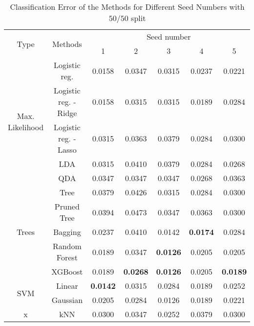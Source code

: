 \begin{table}[htb]
	\caption{Classification Error of the Methods for Different Seed Numbers with $50/50$ split}
	\begin{center}
		\begin{tabular}{@{} c c c  c c c c @{}}\toprule
			\multirow{2}{*}{Type} & \multirow{2}{*}{Methods} &  \multicolumn{5}{c}{Seed number}\\
			& & 1 & 2 & 3 & 4 & 5 \\
			\midrule
			\multirow{5}{*}{Max. Likelihood} & Logistic reg. & \num{0.0158} & \num{0.0347} & \num{0.0315} & \num{0.0237} & \num{0.0221} \\
			& Logistic reg. - Ridge & \num{0.0158} & \num{0.0315} & \num{0.0315} & \num{0.0189} & \num{0.0284} \\
			& Logistic reg. - Lasso & \num{0.0315} & \num{0.0363} & \num{0.0379} & \num{0.0284} & \num{0.0300} \\
			& LDA & \num{0.0315} & \num{0.0410} & \num{0.0379} & \num{0.0284} & \num{0.0268} \\
			& QDA & \num{0.0347} & \num{0.0347} & \num{0.0347} & \num{0.0268} & \num{0.0363} \\
			\cmidrule{1-7}
			\multirow{5}{*}{Trees} & Tree & \num{0.0379} & \num{0.0426} & \num{0.0315} & \num{0.0284} & \num{0.0300}\\
			& Pruned Tree & \num{0.0394} & \num{0.0473} & \num{0.0347} & \num{0.0363} & \num{0.0300}\\  
			& Bagging & \num{0.0237} & \num{0.0410} & \num{0.0142} & \textbf{\num{0.0174}} & \num{0.0284}\\
			& Random Forest & \num{0.0189} & \num{0.0347} & \textbf{\num{0.0126}} & \num{0.0205} & \num{0.0205}\\
			& XGBoost & \num{0.0189} & \textbf{\num{0.0268}} & \textbf{\num{0.0126}} & \num{0.0205} & \textbf{\num{0.0189}}\\
			\cmidrule{1-7}
			\multirow{2}{*}{SVM} & Linear & \textbf{\num{0.0142}} & \num{0.0315} & \num{0.0284} & \num{0.0189} & \num{0.0252}\\
			& Gaussian & \num{0.0205} & \num{0.0284} & \num{0.0126} & \num{0.0189} & \num{0.0221}\\
			\cmidrule{1-7}
			x & kNN & \num{0.0300} & \num{0.0347} & \num{0.0252} & \num{0.0379} & \num{0.0300}\\
			\bottomrule
		\end{tabular}
	\end{center}
	\label{tab_res_our_strategy}
\end{table}